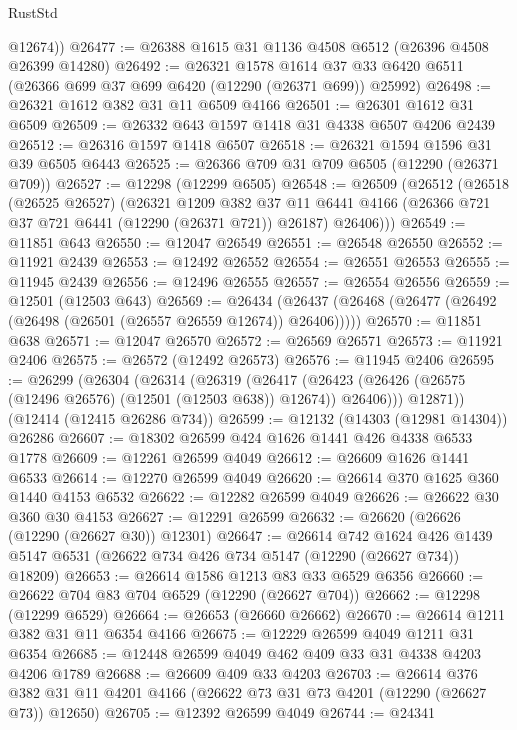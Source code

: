 \begin{lexlean}{RustStd}
\begin{coremodule}
        @12674))
@26477 := @26388 @1615 @31 @1136 @4508 @6512 (@26396 @4508 @26399 @14280)
@26492 := @26321
    @1578
    @1614
    @37
    @33
    @6420
    @6511
    (@26366 @699 @37 @699 @6420 (@12290 (@26371 @699)) @25992)
@26498 := @26321 @1612 @382 @31 @11 @6509 @4166
@26501 := @26301 @1612 @31 @6509
@26509 := @26332 @643 @1597 @1418 @31 @4338 @6507 @4206 @2439
@26512 := @26316 @1597 @1418 @6507
@26518 := @26321 @1594 @1596 @31 @39 @6505 @6443
@26525 := @26366 @709 @31 @709 @6505 (@12290 (@26371 @709))
@26527 := @12298 (@12299 @6505)
@26548 := @26509
    (@26512
      (@26518
        (@26525 @26527)
        (@26321
          @1209
          @382
          @37
          @11
          @6441
          @4166
          (@26366 @721 @37 @721 @6441 (@12290 (@26371 @721)) @26187)
          @26406)))
@26549 := @11851 @643
@26550 := @12047 @26549
@26551 := @26548 @26550
@26552 := @11921 @2439
@26553 := @12492 @26552
@26554 := @26551 @26553
@26555 := @11945 @2439
@26556 := @12496 @26555
@26557 := @26554 @26556
@26559 := @12501 (@12503 @643)
@26569 := @26434 (@26437 (@26468 (@26477 (@26492 (@26498 (@26501 (@26557 @26559 @12674)) @26406)))))
@26570 := @11851 @638
@26571 := @12047 @26570
@26572 := @26569 @26571
@26573 := @11921 @2406
@26575 := @26572 (@12492 @26573)
@26576 := @11945 @2406
@26595 := @26299
    (@26304
      (@26314
        (@26319
          (@26417 (@26423 (@26426 (@26575 (@12496 @26576) (@12501 (@12503 @638)) @12674)) @26406)))
        @12871))
    (@12414 (@12415 @26286 @734))
@26599 := @12132 (@14303 (@12981 @14304)) @26286
@26607 := @18302 @26599 @424 @1626 @1441 @426 @4338 @6533 @1778
@26609 := @12261 @26599 @4049
@26612 := @26609 @1626 @1441 @6533
@26614 := @12270 @26599 @4049
@26620 := @26614 @370 @1625 @360 @1440 @4153 @6532
@26622 := @12282 @26599 @4049
@26626 := @26622 @30 @360 @30 @4153
@26627 := @12291 @26599
@26632 := @26620 (@26626 (@12290 (@26627 @30)) @12301)
@26647 := @26614
    @742
    @1624
    @426
    @1439
    @5147
    @6531
    (@26622 @734 @426 @734 @5147 (@12290 (@26627 @734)) @18209)
@26653 := @26614 @1586 @1213 @83 @33 @6529 @6356
@26660 := @26622 @704 @83 @704 @6529 (@12290 (@26627 @704))
@26662 := @12298 (@12299 @6529)
@26664 := @26653 (@26660 @26662)
@26670 := @26614 @1211 @382 @31 @11 @6354 @4166
@26675 := @12229 @26599 @4049 @1211 @31 @6354
@26685 := @12448 @26599 @4049 @462 @409 @33 @31 @4338 @4203 @4206 @1789
@26688 := @26609 @409 @33 @4203
@26703 := @26614
    @376
    @382
    @31
    @11
    @4201
    @4166
    (@26622 @73 @31 @73 @4201 (@12290 (@26627 @73)) @12650)
@26705 := @12392 @26599 @4049
@26744 := @24341

\end{coremodule}
\end{lexlean}
